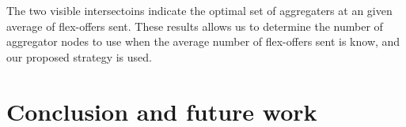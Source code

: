 \documentclass{ifacconf}
\begin{document}
The two visible intersectoins indicate the optimal set of aggregaters at an given average of flex-offers sent. 
These results allows us to determine the number of aggregator nodes to use when the average number of flex-offers sent is know, and our proposed strategy is used.   

\section{Conclusion and future work}









\appendix
{}
\end{document}
